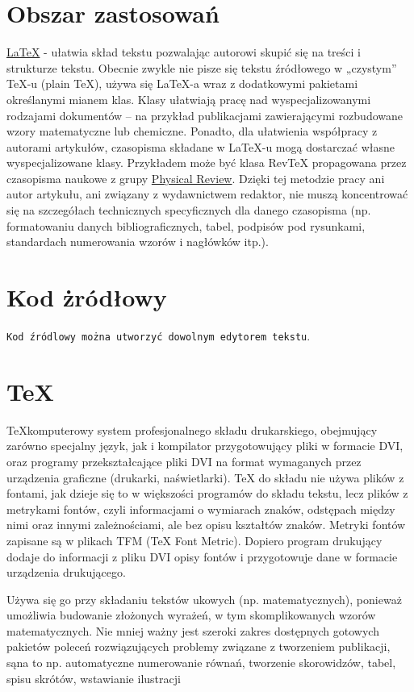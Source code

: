 \documentclass[a4paper,12pt]{scrbook}
\begin{document}
\section{Obszar zastosowań}

\underline{LaTeX} - ułatwia skład tekstu pozwalając autorowi skupić się na treści i strukturze tekstu. Obecnie zwykle nie pisze się tekstu źródłowego w „czystym” TeX-u (plain TeX), używa się LaTeX-a wraz z dodatkowymi pakietami określanymi mianem klas. Klasy ułatwiają pracę nad wyspecjalizowanymi rodzajami dokumentów – na przykład publikacjami zawierającymi rozbudowane wzory matematyczne lub chemiczne. Ponadto, dla ułatwienia współpracy z autorami artykułów, czasopisma składane w LaTeX-u mogą dostarczać własne wyspecjalizowane klasy. Przykładem może być klasa RevTeX propagowana przez czasopisma naukowe z grupy \underline{Physical Review}. Dzięki tej metodzie pracy ani autor artykułu, ani związany z wydawnictwem redaktor, nie muszą koncentrować się na szczegółach technicznych specyficznych dla danego czasopisma (np. formatowaniu danych bibliograficznych, tabel, podpisów pod rysunkami, standardach numerowania wzorów i nagłówków itp.).

	
	
\section{Kod żródłowy}
	
\verb "Kod źródlowy można utworzyć dowolnym edytorem tekstu".
	
	
\section{\TeX}

\Large{\TeX  komputerowy system profesjonalnego składu drukarskiego, obejmujący zarówno specjalny język, jak i kompilator przygotowujący pliki w formacie DVI, oraz programy przekształcające pliki DVI na format wymaganych przez urządzenia graficzne (drukarki, naświetlarki). TeX do składu nie używa plików z fontami, jak dzieje się to w większości programów do składu tekstu, lecz plików z metrykami fontów, czyli informacjami o wymiarach znaków, odstępach między nimi oraz innymi zależnościami, ale bez opisu kształtów znaków. Metryki fontów zapisane są w plikach TFM (TeX Font Metric). Dopiero program drukujący dodaje do informacji z pliku DVI opisy fontów i przygotowuje dane w formacie urządzenia drukującego.
	
	Używa się go przy składaniu tekstów ukowych (np. matematycznych), ponieważ umożliwia budowanie złożonych wyrażeń, w tym skomplikowanych wzorów matematycznych. Nie mniej ważny jest szeroki zakres dostępnych gotowych pakietów poleceń rozwiązujących problemy związane z tworzeniem publikacji, sąna to np. automatyczne numerowanie równań, tworzenie skorowidzów, tabel, spisu skrótów, wstawianie ilustracji}
\end{document}
